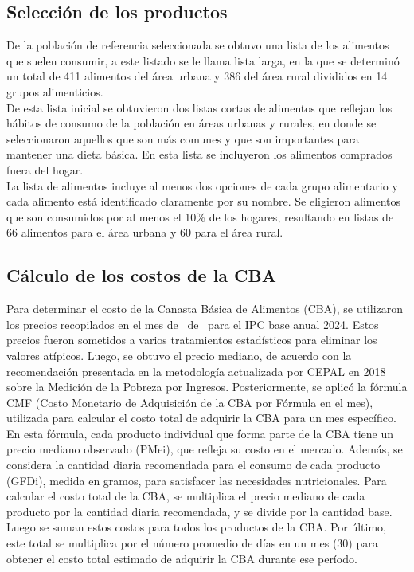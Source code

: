\documentclass[letterpaper, 12pt, twoside]{article}
\begin{document}
\newpage

\subsection{Selección de los productos}

De la población de referencia seleccionada se obtuvo una lista de los alimentos
que suelen consumir, a este listado se le llama lista larga, en la que se
determinó un total de 411 alimentos del área urbana y 386 del área rural
divididos en 14 grupos alimenticios.
\\[\baselineskip]
De esta lista inicial se obtuvieron dos listas cortas de alimentos que reflejan
los hábitos de consumo de la población en áreas urbanas y rurales, en donde se
seleccionaron aquellos que son más comunes y que son importantes para mantener
una dieta básica.
En esta lista se incluyeron los alimentos comprados fuera del hogar.
\\[\baselineskip]
La lista de alimentos incluye al menos dos opciones de cada grupo alimentario y
cada alimento está identificado claramente por su nombre. Se eligieron alimentos
que son consumidos por al menos el 10\% de los hogares, resultando en listas de
66 alimentos para el área urbana y 60 para el área rural.

\subsection{Cálculo de los costos de la CBA}

Para determinar el costo de la Canasta Básica de Alimentos (CBA), se utilizaron
los precios recopilados en el mes de \mes\ de \anio\ para el IPC base anual
2024.
Estos precios fueron sometidos a varios tratamientos estadísticos para eliminar
los valores atípicos.
Luego, se obtuvo el precio mediano, de acuerdo con la recomendación presentada
en la metodología actualizada por CEPAL en 2018 sobre la Medición de la Pobreza
por Ingresos.
Posteriormente, se aplicó la fórmula CMF (Costo Monetario de Adquisición de la
CBA por Fórmula en el mes), utilizada para calcular el costo total de adquirir
la CBA para un mes específico.
\\[\baselineskip]
En esta fórmula, cada producto individual que forma parte de la CBA tiene un
precio mediano observado (PMei), que refleja su costo en el mercado. Además, se
considera la cantidad diaria recomendada para el consumo de cada producto
(GFDi), medida en gramos, para satisfacer las necesidades nutricionales.
Para calcular el costo total de la CBA, se multiplica el precio mediano de cada
producto por la cantidad diaria recomendada, y se divide por la cantidad base.
Luego se suman estos costos para todos los productos de la CBA.
Por último, este total se multiplica por el número promedio de días en un mes
(30) para obtener el costo total estimado de adquirir la CBA durante ese
período.
\end{document}
